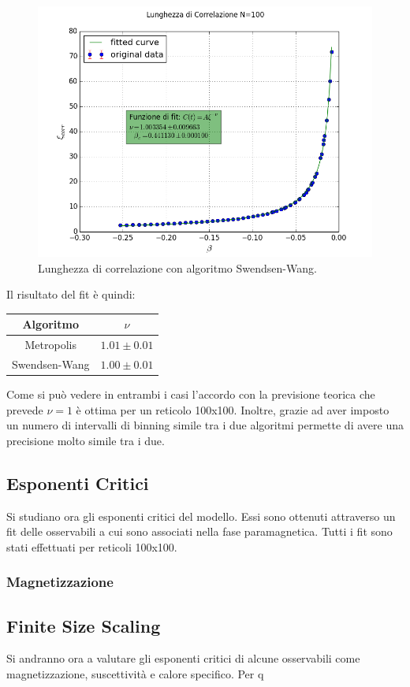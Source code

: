 \begin{figure}[t]
\centering
	\includegraphics[scale=0.56]{sw/corrN100.png}
\caption{Lunghezza di correlazione con algoritmo Swendsen-Wang.}
\end{figure}
Il risultato del fit è quindi:
\begin{center}
	\begin{tabular}{cc}
	\toprule
	Algoritmo & $\nu$ \\
	\midrule
	Metropolis & $ 1.01 \pm 0.01 $\\
	Swendsen-Wang	& $ 1.00 \pm 0.01 $\\
	\bottomrule
	\end{tabular}
\end{center}

Come si può vedere in entrambi i casi l'accordo con la previsione teorica che prevede $\nu = 1$ è ottima per un reticolo 100x100. Inoltre, grazie ad aver imposto un numero di intervalli di binning simile tra i due algoritmi permette di avere una precisione molto simile tra i due.

\subsection{Esponenti Critici}
Si studiano ora gli esponenti critici del modello. Essi sono ottenuti attraverso un fit delle osservabili a cui sono associati nella fase paramagnetica. Tutti i fit sono stati effettuati per reticoli 100x100.
\subsubsection{Magnetizzazione}



\subsection{Finite Size Scaling}
Si andranno ora a valutare gli esponenti critici di alcune osservabili come magnetizzazione, suscettività e calore specifico. Per q





